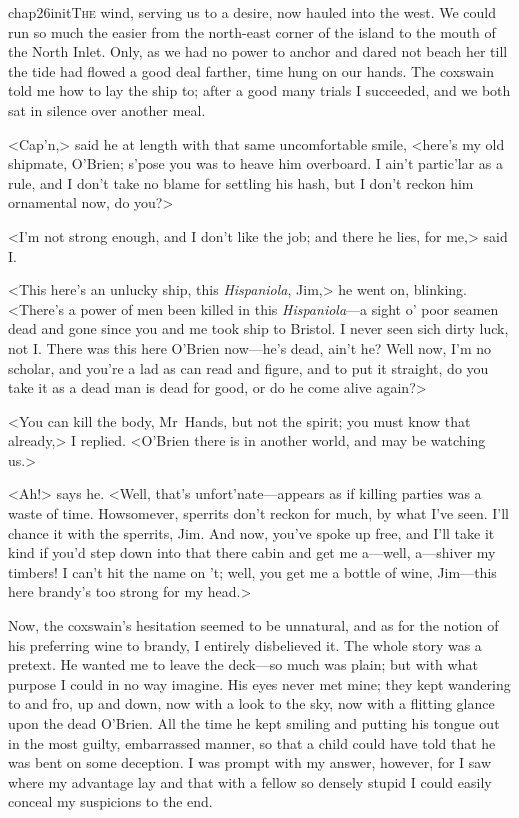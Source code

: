 
\lettrine{chap26initT}{he} wind, serving us to a desire, now hauled into the west. We could run so much the easier from the north-east corner of the island to the mouth of the North Inlet. Only, as we had no power to anchor and dared not beach her till the tide had flowed a good deal farther, time hung on our hands. The coxswain told me how to lay the ship to; after a good many trials I succeeded, and we both sat in silence over another meal.

<Cap'n,> said he at length with that same uncomfortable smile, <here's my old shipmate, O'Brien; s'pose you was to heave him overboard. I ain't partic'lar as a rule, and I don't take no blame for settling his hash, but I don't reckon him ornamental now, do you?>

<I'm not strong enough, and I don't like the job; and there he lies, for me,> said I\@.

<This here's an unlucky ship, this \textit{Hispaniola}, Jim,> he went on, blinking. <There's a power of men been killed in this \textit{Hispaniola}—a sight o' poor seamen dead and gone since you and me took ship to Bristol. I never seen sich dirty luck, not I\@. There was this here O'Brien now—he's dead, ain't he? Well now, I'm no scholar, and you're a lad as can read and figure, and to put it straight, do you take it as a dead man is dead for good, or do he come alive again?>

<You can kill the body, Mr~Hands, but not the spirit; you must know that already,> I replied. <O'Brien there is in another world, and may be watching us.>

<Ah!> says he. <Well, that's unfort'nate—appears as if killing parties was a waste of time. Howsomever, sperrits don't reckon for much, by what I've seen. I'll chance it with the sperrits, Jim. And now, you've spoke up free, and I'll take it kind if you'd step down into that there cabin and get me a—well, a—shiver my timbers! I can't hit the name on 't; well, you get me a bottle of wine, Jim—this here brandy's too strong for my head.>

Now, the coxswain's hesitation seemed to be unnatural, and as for the notion of his preferring wine to brandy, I entirely disbelieved it. The whole story was a pretext. He wanted me to leave the deck—so much was plain; but with what purpose I could in no way imagine. His eyes never met mine; they kept wandering to and fro, up and down, now with a look to the sky, now with a flitting glance upon the dead O'Brien. All the time he kept smiling and putting his tongue out in the most guilty, embarrassed manner, so that a child could have told that he was bent on some deception. I was prompt with my answer, however, for I saw where my advantage lay and that with a fellow so densely stupid I could easily conceal my suspicions to the end.


